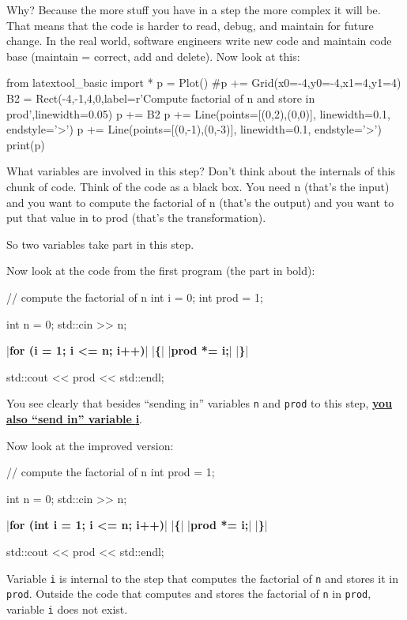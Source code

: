 Why? Because the more stuff you have in a step the more complex it will be. That means that the code is harder to read, debug, and maintain for future change. In the real world, software engineers write new code and maintain code base (maintain = correct, add and delete). Now look at this:

\begin{python}
from latextool_basic import *
p = Plot()
#p += Grid(x0=-4,y0=-4,x1=4,y1=4)
B2 = Rect(-4,-1,4,0,label=r'Compute factorial of n and store in prod',linewidth=0.05)
p += B2
p += Line(points=[(0,2),(0,0)], linewidth=0.1, endstyle='>')
p += Line(points=[(0,-1),(0,-3)], linewidth=0.1, endstyle='>')
print(p)
\end{python}

What variables are involved in this step? Don't think about the internals of this chunk of code. Think of the code as a black box. You need n (that's the input) and you want to compute the factorial of n (that's the output) and you want to put that value in to prod (that's the transformation).

So two variables take part in this step.

Now look at the code from the first program (the part in bold):

\begin{consolethree}[escapeinside=||]
// compute the factorial of n
int i = 0;
int prod = 1;

int n = 0;
std::cin >> n;

|\textbf{for (i = 1; i <= n; i++)}|
|\textbf{\{}|
    |\textbf{prod *= i;}|
|\textbf{\}}|

std::cout << prod << std::endl; 
\end{consolethree}

You see clearly that besides ``sending in'' variables \texttt{n} and \texttt{prod} to this step, \underline{\textbf{you also ``send in'' variable }\textbf{i}}.

Now look at the improved version:

\begin{consolethree}[escapeinside=||]
// compute the factorial of n
int prod = 1;

int n = 0;
std::cin >> n;

|\textbf{for (int i = 1; i <= n; i++)}|
|\textbf{\{}|
    |\textbf{prod *= i;}|
|\textbf{\}}|

std::cout << prod << std::endl; 
\end{consolethree}

Variable \texttt{i} is internal to the step that computes the factorial of \texttt{n} and stores it in \texttt{prod}. Outside the code that computes and stores the factorial of \texttt{n} in \texttt{prod}, variable \texttt{i} does not exist.

